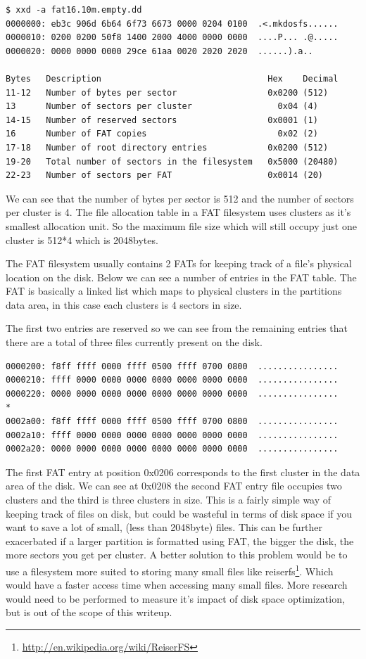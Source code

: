 \documentclass[a4paper,
    11pt,
    normalheadings,
    parindent,
    UKenglish,
    abstracton,
    ]{scrartcl}
\begin{document}
\begin{verbatim}
$ xxd -a fat16.10m.empty.dd
0000000: eb3c 906d 6b64 6f73 6673 0000 0204 0100  .<.mkdosfs......
0000010: 0200 0200 50f8 1400 2000 4000 0000 0000  ....P... .@.....
0000020: 0000 0000 0000 29ce 61aa 0020 2020 2020  ......).a..

Bytes   Description                                 Hex    Decimal
11-12   Number of bytes per sector                  0x0200 (512)
13      Number of sectors per cluster                 0x04 (4)
14-15   Number of reserved sectors                  0x0001 (1)
16      Number of FAT copies                          0x02 (2)
17-18   Number of root directory entries            0x0200 (512)
19-20   Total number of sectors in the filesystem   0x5000 (20480)
22-23   Number of sectors per FAT                   0x0014 (20)
\end{verbatim}

We can see that the number of bytes per sector is 512 and the number of sectors per cluster is 4. The file allocation table in a FAT filesystem uses clusters as it's smallest allocation unit. So the maximum file size which will still occupy just one cluster is 512*4 which is 2048bytes.

The FAT filesystem usually contains 2 FATs for keeping track of a file's physical location on the disk. Below we can see a number of entries in the FAT table. The FAT is basically a linked list which maps to physical clusters in the partitions data area, in this case each clusters is 4 sectors in size.

The first two entries are reserved so we can see from the remaining entries that there are a total of three files currently present on the disk.

\begin{verbatim}
0000200: f8ff ffff 0000 ffff 0500 ffff 0700 0800  ................
0000210: ffff 0000 0000 0000 0000 0000 0000 0000  ................
0000220: 0000 0000 0000 0000 0000 0000 0000 0000  ................
*
0002a00: f8ff ffff 0000 ffff 0500 ffff 0700 0800  ................
0002a10: ffff 0000 0000 0000 0000 0000 0000 0000  ................
0002a20: 0000 0000 0000 0000 0000 0000 0000 0000  ................
\end{verbatim}

The first FAT entry at position 0x0206 corresponds to the first cluster in the data area of the disk.  We can see at 0x0208 the second FAT entry file occupies two clusters and the third is three clusters in size. This is a fairly simple way of keeping track of files on disk, but could be wasteful in terms of disk space if you want to save a lot of small, (less than 2048byte) files. This can be further exacerbated if a larger partition is formatted using FAT, the bigger the disk, the more sectors you get per cluster. A better solution to this problem would be to use a filesystem more suited to storing many small files like reiserfs\footnote{\url{http://en.wikipedia.org/wiki/ReiserFS}}. Which would have a faster access time when accessing many small files. More research would need to be performed to measure it's impact of disk space optimization, but is out of the scope of this writeup.
\end{document}
